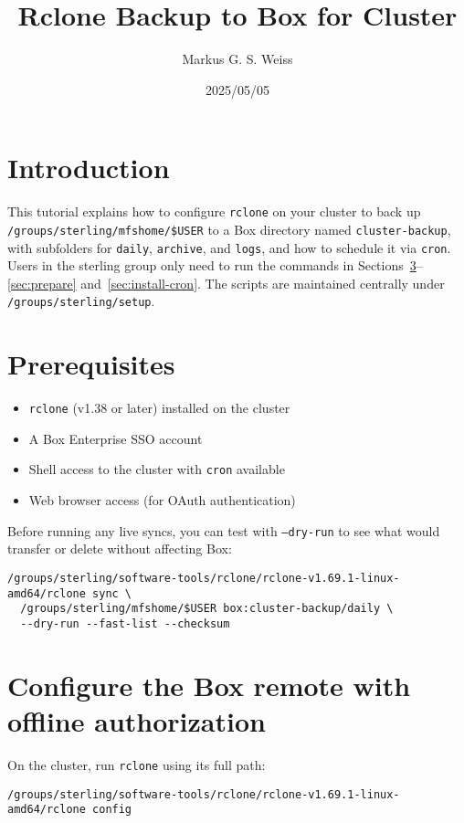 \documentclass[12pt,letterpaper]{article}
\title{\LARGE Rclone Backup to Box for Cluster}
\author{Markus G. S. Weiss}
\date{2025/05/05}
\begin{document}
\maketitle

\tableofcontents
\newpage

\section{Introduction}
This tutorial explains how to configure \texttt{rclone} on your cluster to back up
\texttt{/groups/sterling/mfshome/\$USER} to a Box directory named \texttt{cluster-backup},
with subfolders for \texttt{daily}, \texttt{archive}, and \texttt{logs}, and how to
schedule it via \texttt{cron}. Users in the sterling group only need to run the commands in
Sections~\ref{sec:configure}--\ref{sec:prepare} and~\ref{sec:install-cron}. The scripts are
maintained centrally under \verb|/groups/sterling/setup|.

\section{Prerequisites}
\begin{itemize}
  \item \texttt{rclone} (v1.38 or later) installed on the cluster
  \item A Box Enterprise SSO account
  \item Shell access to the cluster with \texttt{cron} available
  \item Web browser access (for OAuth authentication)
\end{itemize}

\begin{tcolorbox}[title=Tip]
Before running any live syncs, you can test with \texttt{--dry-run} to see what would transfer
or delete without affecting Box:
\begin{lstlisting}[style=custombash]
/groups/sterling/software-tools/rclone/rclone-v1.69.1-linux-amd64/rclone sync \
  /groups/sterling/mfshome/$USER box:cluster-backup/daily \
  --dry-run --fast-list --checksum
\end{lstlisting}
\end{tcolorbox}

\section{Configure the Box remote with offline authorization}
\label{sec:configure}
On the cluster, run \texttt{rclone} using its full path:
\begin{lstlisting}[style=custombash]
/groups/sterling/software-tools/rclone/rclone-v1.69.1-linux-amd64/rclone config
\end{lstlisting}
\end{document}
